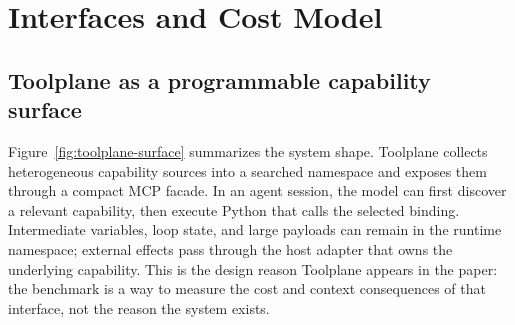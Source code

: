 \documentclass[10pt,twocolumn]{article}
\begin{document}
\section{Interfaces and Cost Model}
\label{sec:model}

\subsection{Toolplane as a programmable capability surface}

Figure~\ref{fig:toolplane-surface} summarizes the system shape.  Toolplane
collects heterogeneous capability sources into a searched namespace and exposes
them through a compact MCP facade.  In an agent session, the model can first
discover a relevant capability, then execute Python that calls the selected
binding.  Intermediate variables, loop state, and large payloads can remain in
the runtime namespace; external effects pass through the host adapter that owns
the underlying capability.  This is the design reason Toolplane appears in the
paper: the benchmark is a way to measure the cost and context consequences of
that interface, not the reason the system exists.
\end{document}
